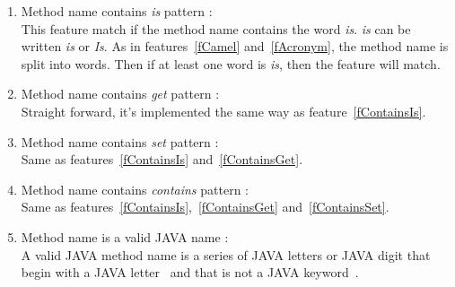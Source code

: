 \documentclass[12pt]{article}
\begin{document}
\begin{enumerate}
\item Method name contains \textit{is} pattern :\label{fContainsIs}\\
	This feature match if the method name contains the word \textit{is}. \textit{is} can be written \textit{is} or \textit{Is}. As in features~\ref{fCamel} and~\ref{fAcronym}, the method name is split into words. Then if at least one word is \textit{is}, then the feature will match. 
\item Method name contains \textit{get} pattern :\label{fContainsGet}\\
	Straight forward, it's implemented the same way as feature~\ref{fContainsIs}.
\item Method name contains \textit{set} pattern :\label{fContainsSet}\\
	Same as features~\ref{fContainsIs} and~\ref{fContainsGet}.
\item Method name contains \textit{contains} pattern :\\
	Same as features~\ref{fContainsIs},~\ref{fContainsGet} and~\ref{fContainsSet}.
\item Method name is a valid JAVA name :\\
	A valid JAVA method name is a series of JAVA letters or JAVA digit that begin with a JAVA letter~\cite{jls_ident} and that is not a JAVA keyword~\cite{jls_keyword}. %


\end{enumerate}
\end{document}
